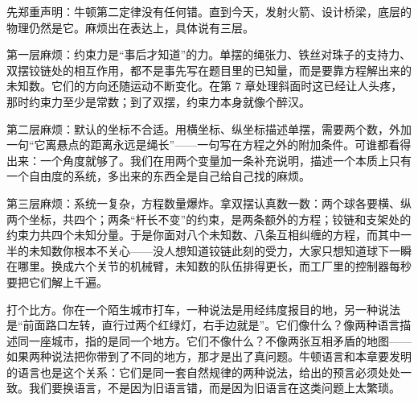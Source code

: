 \begin{mainline}
先郑重声明：牛顿第二定律没有任何错。直到今天，发射火箭、设计桥梁，底层的物理仍然是它。麻烦出在表达上，具体说有三层。

第一层麻烦：约束力是“事后才知道”的力。单摆的绳张力、铁丝对珠子的支持力、双摆铰链处的相互作用，都不是事先写在题目里的已知量，而是要靠方程解出来的未知数。它们的方向还随运动不断变化。在第 7 章处理斜面时这已经让人头疼，那时约束力至少是常数；到了双摆，约束力本身就像个醉汉。

第二层麻烦：默认的坐标不合适。用横坐标、纵坐标描述单摆，需要两个数，外加一句“它离悬点的距离永远是绳长”——一句写在方程之外的附加条件。可谁都看得出来：一个角度就够了。我们在用两个变量加一条补充说明，描述一个本质上只有一个自由度的系统，多出来的东西全是自己给自己找的麻烦。

第三层麻烦：系统一复杂，方程数量爆炸。拿双摆认真数一数：两个球各要横、纵两个坐标，共四个；两条“杆长不变”的约束，是两条额外的方程；铰链和支架处的约束力共四个未知分量。于是你面对八个未知数、八条互相纠缠的方程，而其中一半的未知数你根本不关心——没人想知道铰链此刻的受力，大家只想知道球下一瞬在哪里。换成六个关节的机械臂，未知数的队伍排得更长，而工厂里的控制器每秒要把它们解上千遍。

打个比方。你在一个陌生城市打车，一种说法是用经纬度报目的地，另一种说法是“前面路口左转，直行过两个红绿灯，右手边就是”。它们像什么？像两种语言描述同一座城市，指的是同一个地方。它们不像什么？不像两张互相矛盾的地图——如果两种说法把你带到了不同的地方，那才是出了真问题。牛顿语言和本章要发明的语言也是这个关系：它们是同一套自然规律的两种说法，给出的预言必须处处一致。我们要换语言，不是因为旧语言错，而是因为旧语言在这类问题上太繁琐。
\end{mainline}


